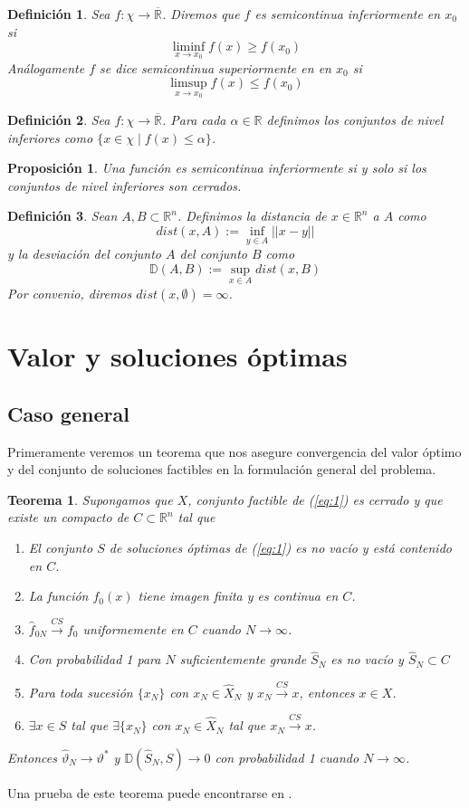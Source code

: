 \documentclass[twoside,a4paper,openright,12pt]{book}
\newtheorem{defi}{Definici\'on}[section]
\newtheorem{prop}{Proposici\'on}[section]
\newtheorem{thm}{Teorema}[section]
\providecommand{\convcs}{\xrightarrow{CS}}
\providecommand{\func}[2]{\colon{#1}\longrightarrow{#2}}
\newcommand{\R}{\mathbb{R}}
\newcommand{\va}{\hat{\vartheta}_N}
\begin{document}
\begin{defi}
Sea $f\func{\chi}{\overline{\R}}$. Diremos que $f$ es semicontinua inferiormente en $x_0$ si 
$$
\liminf_{x\to x_0}f(x)\geq f(x_0)
$$
Análogamente $f$ se dice semicontinua superiormente en  en $x_0$ si
$$
\limsup_{x\to x_0}f(x)\leq f(x_0)$$
\end{defi}
\begin{defi}
Sea $f\func{\chi}{\overline{\R}}$. Para cada $\alpha\in\R$ definimos los conjuntos de nivel inferiores como $\{x\in \chi\mid f(x)\leq \alpha\}$.  
\end{defi}
\begin{prop}\label{level}
Una función es semicontinua inferiormente si y solo si los conjuntos de nivel inferiores son cerrados.
\end{prop}
\begin{defi}
Sean $A,B\subset \R^n$. Definimos la distancia de $x\in\R^n$ a $A$ como
$$
dist(x,A):=\inf_{y\in A}||x-y||
$$
y la desviación del conjunto $A$ del conjunto $B$ como
$$
\mathbb{D}(A,B):=\sup_{x\in A}dist(x,B)
$$
Por convenio, diremos $dist(x,\emptyset)=\infty
$. 
\end{defi}
\section{Valor y soluciones óptimas}
\subsection{Caso general}
Primeramente veremos un teorema que nos asegure convergencia del valor óptimo y del conjunto de soluciones factibles en la formulación general del problema.
\begin{thm}
Supongamos que $X$, conjunto factible de (\ref{eq:1}) es cerrado y que existe un compacto de $C\subset \R^n$ tal que 
\begin{enumerate}
\item El conjunto $S$ de soluciones óptimas de (\ref{eq:1}) es no vacío y está contenido en $C$.
\item La función $f_0(x)$ tiene imagen finita y es continua en $C$.
\item $\hat{f}_{0N}\convcs f_0$ uniformemente en $C$ cuando $N\to \infty$.
\item Con probabilidad 1 para $N$ suficientemente grande $\hat{S}_{N}$ es no vacío y $\hat{S}_N\subset C$
\item Para toda sucesión $\{x_N\}$ con $x_N\in \hat{X}_N$ y $x_N\convcs  x$, entonces $x\in X$. 
\item $\exists x\in S$ tal que $\exists\{x_N\}$ con $ x_N \in \hat{X}_N$ tal que $x_N\convcs x$. 
\end{enumerate}
Entonces $\va\to \vartheta^*$ y $\mathbb{D}(\hat{S}_N,S)\to 0$  con probabilidad 1 cuando $N\to \infty$.
\end{thm}
Una prueba de este teorema puede encontrarse en \cite{lecture}.
\end{document}
